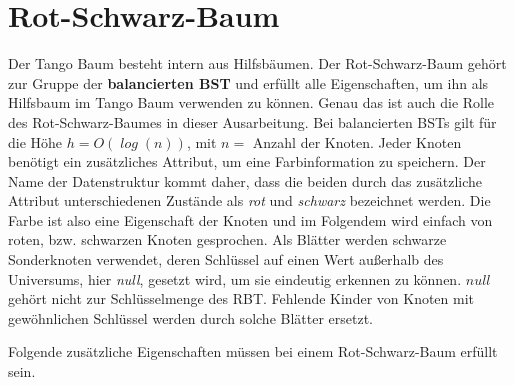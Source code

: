 \documentclass[a4paper,12pt]{article}
\begin{document}
\section{Rot-Schwarz-Baum}
Der Tango Baum besteht intern aus Hilfsbäumen. Der Rot-Schwarz-Baum gehört zur Gruppe der \textbf{balancierten BST} und erfüllt alle Eigenschaften, um ihn als Hilfsbaum im Tango Baum verwenden zu können. Genau das ist auch die Rolle des Rot-Schwarz-Baumes in dieser Ausarbeitung. Bei balancierten BSTs gilt für die Höhe $h = \mathit{O(\log\left( n\right))}$, mit $n =$ Anzahl der Knoten. Jeder Knoten benötigt ein zusätzliches Attribut, um eine Farbinformation zu speichern. Der Name der Datenstruktur kommt daher, dass die beiden durch das zusätzliche Attribut unterschiedenen Zustände als \textit{rot} und \textit{schwarz} bezeichnet werden. Die Farbe ist also eine Eigenschaft der Knoten und im Folgendem wird einfach von roten, bzw. schwarzen Knoten gesprochen. Als Blätter werden schwarze Sonderknoten verwendet, deren Schlüssel auf einen Wert außerhalb des Universums, hier \textit{null}, gesetzt wird, um sie eindeutig erkennen zu können. $\mathit{null}$ gehört nicht zur Schlüsselmenge des RBT. Fehlende Kinder von Knoten mit gewöhnlichen Schlüssel werden durch solche Blätter ersetzt.  

\noindent Folgende zusätzliche Eigenschaften müssen bei einem Rot-Schwarz-Baum erfüllt sein. 
\end{document}
